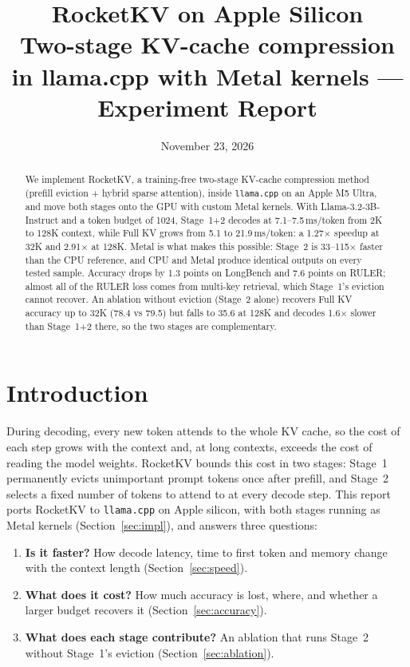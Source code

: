 \documentclass[10pt,letterpaper]{article}
\title{\textbf{RocketKV on Apple Silicon}\\[2pt]\large Two-stage KV-cache compression in llama.cpp with Metal kernels --- Experiment Report}
\date{November 23, 2026}
\newcommand{\code}[1]{\texttt{#1}}
\begin{document}
\maketitle

\begin{abstract}
\noindent
We implement RocketKV, a training-free two-stage KV-cache compression method (prefill eviction + hybrid sparse attention), inside \code{llama.cpp} on an Apple M5 Ultra, and move both stages onto the GPU with custom Metal kernels.
With Llama-3.2-3B-Instruct and a token budget of 1024, Stage~1+2 decodes at 7.1--7.5\,ms/token from 2K to 128K context, while Full KV grows from 5.1 to 21.9\,ms/token: a 1.27$\times$ speedup at 32K and 2.91$\times$ at 128K.
Metal is what makes this possible: Stage~2 is 33--115$\times$ faster than the CPU reference, and CPU and Metal produce identical outputs on every tested sample.
Accuracy drops by 1.3 points on LongBench and 7.6 points on RULER; almost all of the RULER loss comes from multi-key retrieval, which Stage~1's eviction cannot recover.
An ablation without eviction (Stage~2 alone) recovers Full KV accuracy up to 32K (78.4 vs 79.5) but falls to 35.6 at 128K and decodes 1.6$\times$ slower than Stage~1+2 there, so the two stages are complementary.
\end{abstract}

\section{Introduction}

During decoding, every new token attends to the whole KV cache, so the cost of each step grows with the context and, at long contexts, exceeds the cost of reading the model weights. RocketKV bounds this cost in two stages: Stage~1 permanently evicts unimportant prompt tokens once after prefill, and Stage~2 selects a fixed number of tokens to attend to at every decode step. This report ports RocketKV to \code{llama.cpp} on Apple silicon, with both stages running as Metal kernels (Section~\ref{sec:impl}), and answers three questions:
\begin{enumerate}[label=\textbf{Q\arabic*.}]
\item \textbf{Is it faster?} How decode latency, time to first token and memory change with the context length (Section~\ref{sec:speed}).
\item \textbf{What does it cost?} How much accuracy is lost, where, and whether a larger budget recovers it (Section~\ref{sec:accuracy}).
\item \textbf{What does each stage contribute?} An ablation that runs Stage~2 without Stage~1's eviction (Section~\ref{sec:ablation}).
\end{enumerate}
\end{document}
